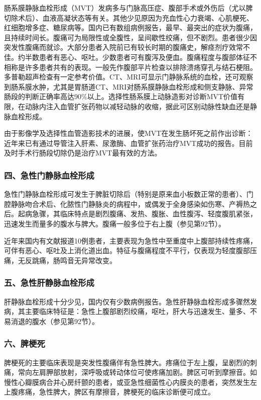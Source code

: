 肠系膜静脉血栓形成（MVT）发病多与门脉高压症、腹部手术或外伤后（尤以脾切除术后）、血液高凝状态等有关。其他少见原因为充血性心力衰竭、心肌梗死、红细胞增多症、糖尿病等。国内已有数组病例报告，最早、最突出的症状为腹痛，且持续时间长。腹痛可为局限性或全腹性，呈间歇性绞痛，但不剧烈。患者很少因突发性腹痛而就诊。大部分患者入院前已有较长时期的腹痛史，解痉剂疗效常不佳。约半数患者有恶心、呕吐。少数患者可有腹泻及便血。腹痛程度与腹部体征不相称是许多患者共有的表现。一般先作腹部平片检查以排除溃疡穿孔与结石梗阻。多普勒超声检查有一定参考价值。CT、MRI可显示门静脉系统的血栓，还可观察到肠系膜水肿，尤其是胃肠道CT、MRI对肠系膜静脉血栓形成和侧支静脉、异常肠段的判断正确率高达90\%以上。选择性肠系膜上动脉造影对诊断MVT价值有限，在动脉内注入血管扩张药物以减轻动脉的收缩，据此可区别动脉性缺血还是静脉血栓形成。

由于影像学及选择性血管造影技术的进展，使MVT在发生肠坏死之前作出诊断：近年来已有通过导管注入肝素、尿激酶、血管扩张药治疗MVT成功的报告。目前及时手术行肠段切除仍是治疗MVT最有效的方法。

\subsubsection{四、急性门静脉血栓形成}

急性门静脉血栓形成可发生于脾脏切除后（特别是原来血小板数正常的患者）、门腔静脉吻合术后、化脓性门静脉炎的病程中，或偶发于全身感染如伤寒、产褥热之后。起病急骤，其临床特点是剧烈腹痛、发热、腹胀、血性腹泻、轻度腹肌紧张，迅速发生而量多的腹水与脾大。腹痛一般多位于右上腹（参见第92节）。

近年来国内有文献报道10例患者，主要表现为急性中至重度中上腹部持续性疼痛，可伴有恶心、呕吐及上消化道出血。特征与腹痛程度不平行，仅表现为轻度腹部压痛，无反跳痛，肠鸣音无异常改变。

\subsubsection{五、急性肝静脉血栓形成}

肝静脉血栓形成十分少见，国内仅有少数病例报告。急性肝静脉血栓形成多骤然发病，其主要临床特征是：急性上腹部剧烈绞痛，呕吐，肝大与迅速发生、量多、不易消退的腹水（参见第92节）。

\subsubsection{六、脾梗死}

脾梗死的主要临床表现是突发性腹痛伴有急性脾大。疼痛位于左上腹，呈剧烈的刺痛，常向左肩胛部放射，深呼吸或转动体位可使疼痛加剧。脾区可听到摩擦音。如慢性心瓣膜病合并心房纤颤的患者，或亚急性细菌性心内膜炎的患者，突然发生左上腹疼痛，急性脾大，脾区有摩擦音，脾梗死的临床诊断便可成立。

